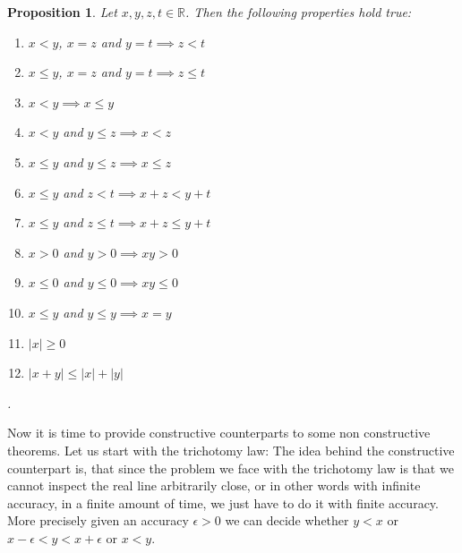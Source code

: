 \documentclass[11pt,a4paper,leqno]{report}
\newtheorem{proposition}{Proposition}[chapter]
\newtheorem{definition}[theorem]{Definition}
\numberwithin{equation}{chapter}
\begin{document}
\begin{proposition} Let $x,y,z,t\in\mathbb{R}$. Then the following properties hold true:
\begin{enumerate}
\item{$x<y$, $x=z$ and $y=t\implies z<t$}
\item{$x\leq y$, $x=z$ and $y=t\implies z\leq t$}
\item{$x<y\implies x\leq y$}
\item{$x<y$ and $y\leq z\implies x<z$}
\item{$x\leq y$ and $y\leq z\implies x\leq z$}
\item{$x\leq y$ and $z<t \implies x + z < y + t$}
\item{$x\leq y$ and $z\leq t \implies x + z \leq y + t$}
\item{$x>0$ and $y>0 \implies xy>0$}
\item{$x\leq 0$ and $y\leq 0 \implies xy\leq 0$}
\item{$x\leq y$ and $y\leq y \implies x=y$}
\item{$|x|\geq 0$}
\item{$|x + y|\leq |x| + |y|$}
\end{enumerate}\cite{CANA}.
\end{proposition}
Now it is time to provide constructive counterparts to some non constructive theorems. Let us start with the trichotomy law: The idea behind the constructive counterpart is, that since the problem we face with the trichotomy law is that we cannot inspect the real line arbitrarily close, or in other words with infinite accuracy, in a finite amount of time, we just have to do it with finite accuracy. More precisely given an accuracy $\epsilon>0$ we can decide whether $y<x$ or $x-\epsilon<y<x+\epsilon$ or $x<y$.
\end{document}

